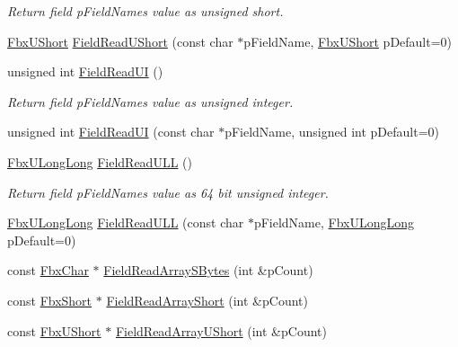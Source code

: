 \begin{Indent}
\begin{DoxyCompactItemize}
\begin{DoxyCompactList}\small\item\em Return field p\+Field\+Name\textquotesingle{}s value as unsigned short. \end{DoxyCompactList}\item 
\hyperlink{fbxtypes_8h_a321ef060885fc068fd77ac69a49f51d9}{Fbx\+U\+Short} \hyperlink{class_fbx_i_o_a1a9c07675b3219fe21570575e6a0b0bd}{Field\+Read\+U\+Short} (const char $\ast$p\+Field\+Name, \hyperlink{fbxtypes_8h_a321ef060885fc068fd77ac69a49f51d9}{Fbx\+U\+Short} p\+Default=0)
\item 
unsigned int \hyperlink{class_fbx_i_o_a76e9dd8ba42fcae62abe6031db76182a}{Field\+Read\+UI} ()
\begin{DoxyCompactList}\small\item\em Return field p\+Field\+Name\textquotesingle{}s value as unsigned integer. \end{DoxyCompactList}\item 
unsigned int \hyperlink{class_fbx_i_o_a4b6c7c0a179a1b0852449c37839e9fae}{Field\+Read\+UI} (const char $\ast$p\+Field\+Name, unsigned int p\+Default=0)
\item 
\hyperlink{fbxtypes_8h_a267f848573cc1e685aa510be4b1298c8}{Fbx\+U\+Long\+Long} \hyperlink{class_fbx_i_o_a364f2217f036c7465426c046b131ceb0}{Field\+Read\+U\+LL} ()
\begin{DoxyCompactList}\small\item\em Return field p\+Field\+Name\textquotesingle{}s value as 64 bit unsigned integer. \end{DoxyCompactList}\item 
\hyperlink{fbxtypes_8h_a267f848573cc1e685aa510be4b1298c8}{Fbx\+U\+Long\+Long} \hyperlink{class_fbx_i_o_a92c6633cb6e20ef5172f3a0f5d05a2d0}{Field\+Read\+U\+LL} (const char $\ast$p\+Field\+Name, \hyperlink{fbxtypes_8h_a267f848573cc1e685aa510be4b1298c8}{Fbx\+U\+Long\+Long} p\+Default=0)
\item 
const \hyperlink{fbxtypes_8h_a34067dfe395a7cf3040b7b263c9024d2}{Fbx\+Char} $\ast$ \hyperlink{class_fbx_i_o_a48d81a6ed1af29d2761b83b742220832}{Field\+Read\+Array\+S\+Bytes} (int \&p\+Count)
\item 
const \hyperlink{fbxtypes_8h_a56e7a4f56baf132527df7c3cd07017b7}{Fbx\+Short} $\ast$ \hyperlink{class_fbx_i_o_a24ebad05bd3a4fb6f30c66c36d44c5a1}{Field\+Read\+Array\+Short} (int \&p\+Count)
\item 
const \hyperlink{fbxtypes_8h_a321ef060885fc068fd77ac69a49f51d9}{Fbx\+U\+Short} $\ast$ \hyperlink{class_fbx_i_o_a4360cbf914839a3fbaa0eedf824f5ded}{Field\+Read\+Array\+U\+Short} (int \&p\+Count)

\end{DoxyCompactItemize}
\end{Indent}
